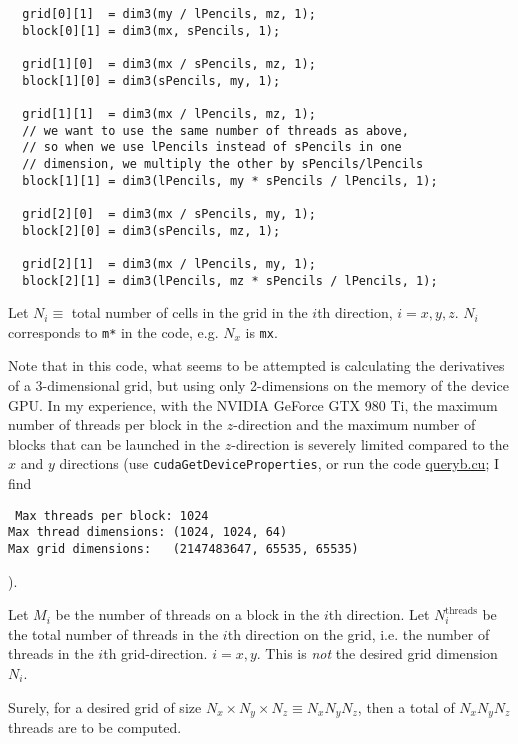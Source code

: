 \documentclass[10pt]{amsart}
\begin{document}
\begin{multicols*}{2}
\begin{lstlisting}
  grid[0][1]  = dim3(my / lPencils, mz, 1);
  block[0][1] = dim3(mx, sPencils, 1);

  grid[1][0]  = dim3(mx / sPencils, mz, 1);
  block[1][0] = dim3(sPencils, my, 1);

  grid[1][1]  = dim3(mx / lPencils, mz, 1);
  // we want to use the same number of threads as above,
  // so when we use lPencils instead of sPencils in one
  // dimension, we multiply the other by sPencils/lPencils
  block[1][1] = dim3(lPencils, my * sPencils / lPencils, 1);

  grid[2][0]  = dim3(mx / sPencils, my, 1);
  block[2][0] = dim3(sPencils, mz, 1);

  grid[2][1]  = dim3(mx / lPencils, my, 1);
  block[2][1] = dim3(lPencils, mz * sPencils / lPencils, 1);
\end{lstlisting}

Let $N_i \equiv $ total number of cells in the grid in the $i$th direction, $i=x,y,z$.  $N_i$ corresponds to \verb|m*| in the code, e.g. $N_x$ is \verb|mx|.  

Note that in this code, what seems to be attempted is calculating the derivatives of a 3-dimensional grid, but using only 2-dimensions on the memory of the device GPU.  In my experience, with the NVIDIA GeForce GTX 980 Ti, the maximum number of threads per block in the $z$-direction and the maximum number of blocks that can be launched in the $z$-direction is severely limited compared to the $x$ and $y$ directions (use \verb|cudaGetDeviceProperties|, or run the code \href{https://github.com/ernestyalumni/CompPhys/blob/master/CUDA-By-Example/queryb.cu}{queryb.cu}; I find
\begin{equation}\label{Code:GTX980Tiproperties}
\end{equation}
  \begin{lstlisting}
 Max threads per block: 1024
Max thread dimensions: (1024, 1024, 64) 
Max grid dimensions:   (2147483647, 65535, 65535) 
\end{lstlisting}
).  

Let $M_i$ be the number of threads on a block in the $i$th direction.  Let $N^{\text{threads}}_i$ be the total number of threads in the $i$th direction on the grid, i.e. the number of threads in the $i$th grid-direction.  $i=x,y$. This is \emph{not} the desired grid dimension $N_i$.   

Surely, for a desired grid of size $N_x\times N_y \times N_z \equiv N_xN_yN_z$, then a total of $N_xN_yN_z$ threads are to be computed.


\end{multicols*}
\end{document}
